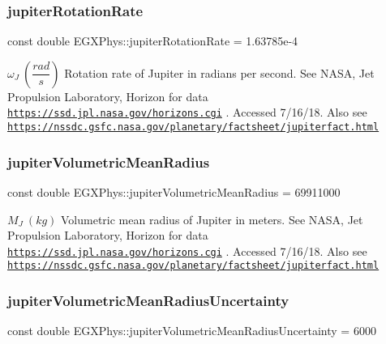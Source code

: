 \subsubsection{\texorpdfstring{jupiter\+Rotation\+Rate}{jupiterRotationRate}}
{\footnotesize\ttfamily const double E\+G\+X\+Phys\+::jupiter\+Rotation\+Rate = 1.\+63785e-\/4}

$ \omega_{J} \ (\dfrac{rad}{s})$ Rotation rate of Jupiter in radians per second. See N\+A\+SA, Jet Propulsion Laboratory, Horizon for data \href{https://ssd.jpl.nasa.gov/horizons.cgi}{\tt https\+://ssd.\+jpl.\+nasa.\+gov/horizons.\+cgi} . Accessed 7/16/18. Also see \href{https://nssdc.gsfc.nasa.gov/planetary/factsheet/jupiterfact.html}{\tt https\+://nssdc.\+gsfc.\+nasa.\+gov/planetary/factsheet/jupiterfact.\+html} \mbox{\label{namespace_e_g_x_phys_a2854b5f809f290c9d1cfa786cd614e86}} 
\subsubsection{\texorpdfstring{jupiter\+Volumetric\+Mean\+Radius}{jupiterVolumetricMeanRadius}}
{\footnotesize\ttfamily const double E\+G\+X\+Phys\+::jupiter\+Volumetric\+Mean\+Radius = 69911000}

$M_{J} \ (kg)$ Volumetric mean radius of Jupiter in meters. See N\+A\+SA, Jet Propulsion Laboratory, Horizon for data \href{https://ssd.jpl.nasa.gov/horizons.cgi}{\tt https\+://ssd.\+jpl.\+nasa.\+gov/horizons.\+cgi} . Accessed 7/16/18. Also see \href{https://nssdc.gsfc.nasa.gov/planetary/factsheet/jupiterfact.html}{\tt https\+://nssdc.\+gsfc.\+nasa.\+gov/planetary/factsheet/jupiterfact.\+html} \mbox{\label{namespace_e_g_x_phys_a8e16665678753a048bc6bdfbffe514bd}} 
\subsubsection{\texorpdfstring{jupiter\+Volumetric\+Mean\+Radius\+Uncertainty}{jupiterVolumetricMeanRadiusUncertainty}}
{\footnotesize\ttfamily const double E\+G\+X\+Phys\+::jupiter\+Volumetric\+Mean\+Radius\+Uncertainty = 6000}

